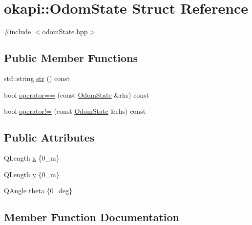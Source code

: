 \hypertarget{structokapi_1_1OdomState}{}\section{okapi\+::Odom\+State Struct Reference}
\label{structokapi_1_1OdomState}


{\ttfamily \#include $<$odom\+State.\+hpp$>$}

\subsection*{Public Member Functions}
\begin{DoxyCompactItemize}
\item 
std\+::string \mbox{\hyperlink{structokapi_1_1OdomState_adfaa3faf1931a8027af8a3cf9de439c1}{str}} () const
\item 
bool \mbox{\hyperlink{structokapi_1_1OdomState_a17668afbbe39bcc745233a679aa917de}{operator==}} (const \mbox{\hyperlink{structokapi_1_1OdomState}{Odom\+State}} \&rhs) const
\item 
bool \mbox{\hyperlink{structokapi_1_1OdomState_a961501c808d8818e959ba111baf7f359}{operator!=}} (const \mbox{\hyperlink{structokapi_1_1OdomState}{Odom\+State}} \&rhs) const
\end{DoxyCompactItemize}
\subsection*{Public Attributes}
\begin{DoxyCompactItemize}
\item 
Q\+Length \mbox{\hyperlink{structokapi_1_1OdomState_a53fbbb483d5073e703517745d769eb45}{x}} \{0\+\_\+m\}
\item 
Q\+Length \mbox{\hyperlink{structokapi_1_1OdomState_afcb08739959ad3afb7941a0bd59bcbb6}{y}} \{0\+\_\+m\}
\item 
Q\+Angle \mbox{\hyperlink{structokapi_1_1OdomState_a7d9c4f949e7ce0dd000c08318e61b921}{theta}} \{0\+\_\+deg\}
\end{DoxyCompactItemize}


\subsection{Member Function Documentation}
\mbox{\label{structokapi_1_1OdomState_a961501c808d8818e959ba111baf7f359}} 
